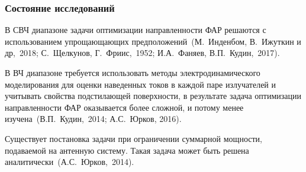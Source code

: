 \begin{frame}
    \frametitle{Состояние исследований}
    В СВЧ диапазоне задачи оптимизации направленности ФАР решаются с использованием упрощающающих предположений~(М.~Инденбом, В.~Ижуткин и др,~2018; С.~Щелкунов, Г.~Фриис,~1952; И.А.~Фаняев, В.П.~Кудин,~2017).

    \vspace{1em}
    В ВЧ диапазоне требуется использовать методы электродинамического моделирования для оценки наведенных токов в каждой паре излучателей и учитывать свойства подстилающей поверхности, в результате задача оптимизации направленности ФАР оказывается более сложной, и потому менее изучена~(В.П.~Кудин,~2014; А.С.~Юрков, 2016).
    \vspace{1em}

    Существует постановка задачи при ограничении суммарной мощности, подаваемой на антенную систему. Такая задача может быть решена аналитически~(А.С.~Юрков,~2014).
\end{frame}

